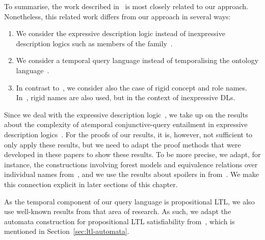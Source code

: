 To summarise, the work described
in~\cite{AKW+-IJCAI13,BoLT-FroCoS13,AFW+-JELIA02,GuKl-RR12} is most closely
related to our approach.  Nonetheless, this related work differs from our
approach in several ways:
\begin{enumerate}
    \item We consider the expressive description logic \SHQ instead of
        inexpressive description logics such as members of the \DLLite
        family~\cite{AKW+-IJCAI13,BoLT-FroCoS13}.
    \item We consider a temporal query language instead of temporalising the
        ontology language~\cite{AKW+-IJCAI13,AFW+-JELIA02}.
    \item In contrast to~\cite{GuKl-RR12}, we consider also the case of rigid
        concept and role names.
        In~\cite{BoLT-FroCoS13,BoLT-DL13,BoLT-LTCS-13-05,AKW+-IJCAI13}, rigid
        names are also used, but in the context of inexpressive DLs.
\end{enumerate}

Since we deal with the expressive description logic~\SHQ, we take up on the
results about the complexity of atemporal conjunctive-query entailment in
expressive description logics~\cite{OrCE-AAAI06,Lut-IJCAR08,GHL+-JAIR08}.  For
the proofs of our results, it is, however, not sufficient to only apply these
results, but we need to adapt the proof methods that were developed in these
papers to show these results.  To be more precise, we adapt, for instance, the
constructions involving forest models and equivalence relations over individual
names from~\cite{GHL+-JAIR08}, and we use the results about spoilers in \SHQcap
from~\cite{Lut-IJCAR08}.  We make this connection explicit in later sections of
this chapter.

As the temporal component of our query language is propositional LTL, we also
use well-known results from that area of research.  As such, we adapt the
automata construction for propositional LTL satisfiability
from~\cite{WoVS-FOCS83,VaWo-IC94}, which is mentioned in
Section~\ref{sec:ltl-automata}.

